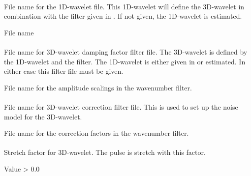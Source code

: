 \paragraph{}
 \slist
   \item \Description File name for the 1D-wavelet file. This 1D-wavelet will define the 3D-wavelet in combination with the filter given in . If not given, the 1D-wavelet is estimated.
   \item \Argument File name
   \item \Default
 \elist

\paragraph{}
 \slist
   \item \Description File name for 3D-wavelet damping factor filter file. The 3D-wavelet is defined by the 1D-wavelet and the filter. The 1D-wavelet is either given in  or estimated. In either case this filter file must be given.
   \item \Argument File name for the amplitude scalings in the wavenumber filter.
   \item \Default
 \elist

\paragraph{}
 \slist
   \item \Description File name for 3D-wavelet correction filter file. This is used to set up the noise model for the 3D-wavelet.
   \item \Argument File name for the correction factors in the wavenumber filter.
   \item \Default
 \elist

\paragraph{}
 \slist
   \item \Description Stretch factor for 3D-wavelet. The pulse is stretch with this factor.
   \item \Argument Value > 0.0
   \item {}
\elist

